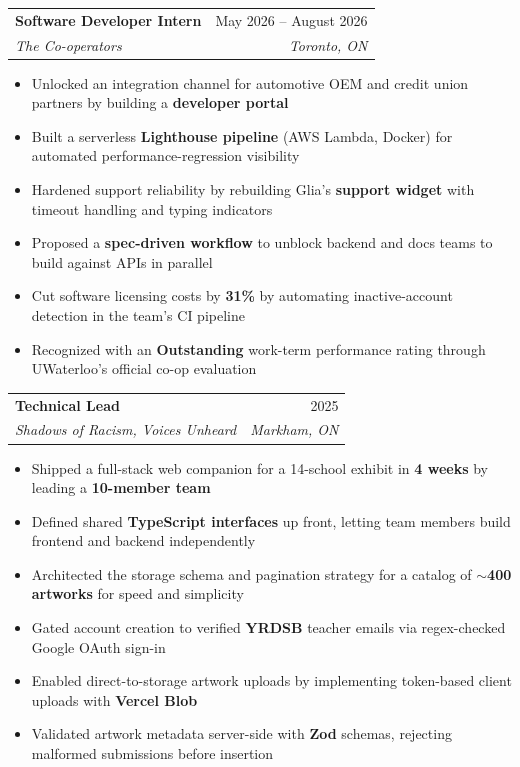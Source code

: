 \documentclass[letterpaper,11pt]{article}
\makeatletter
\newcommand{\resumeItem}[1]{
  \item\small{
    {#1 \vspace{-2pt}}
  }
}
\newcommand{\resumeSubheading}[4]{
  \vspace{-2pt}\item
    \begin{tabular*}{0.97\textwidth}[t]{l@{\extracolsep{\fill}}r}
      \textbf{#1} & #2 \\
      \textit{\small#3} & \textit{\small #4} \\
    \end{tabular*}\vspace{-7pt}
}
\newcommand{\resumeSubSubheading}[2]{
    \item
    \begin{tabular*}{0.97\textwidth}{l@{\extracolsep{\fill}}r}
      \textit{\small#1} & \textit{\small #2} \\
    \end{tabular*}\vspace{-7pt}
}
\newcommand{\resumeSubHeadingListEnd}{\end{itemize}}
\newcommand{\resumeItemListStart}{\begin{itemize}}
\newcommand{\resumeItemListEnd}{\end{itemize}\vspace{-5pt}}
\makeatother
\begin{document}

    \resumeSubheading
      {Software Developer Intern}{May 2026 -- August 2026}
      {The Co-operators}{Toronto, ON}
      \resumeItemListStart
        \resumeItem{Unlocked an integration channel for automotive OEM and credit union partners by building a \textbf{developer portal}}
        \resumeItem{Built a serverless \textbf{Lighthouse pipeline} (AWS Lambda, Docker) for automated performance-regression visibility}
        \resumeItem{Hardened support reliability by rebuilding Glia's \textbf{support widget} with timeout handling and typing indicators}
        \resumeItem{Proposed a \textbf{spec-driven workflow} to unblock backend and docs teams to build against APIs in parallel}
        \resumeItem{Cut software licensing costs by \textbf{31\%} by automating inactive-account detection in the team's CI pipeline}
        \resumeItem{Recognized with an \textbf{Outstanding} work-term performance rating through UWaterloo's official co-op evaluation}
      \resumeItemListEnd

    \resumeSubheading
      {Technical Lead}{2025}
      {Shadows of Racism, Voices Unheard}{Markham, ON}
      \resumeItemListStart
        \resumeItem{Shipped a full-stack web companion for a 14-school exhibit in \textbf{4 weeks} by leading a \textbf{10-member team}}
        \resumeItem{Defined shared \textbf{TypeScript interfaces} up front, letting team members build frontend and backend independently}
        \resumeItem{Architected the storage schema and pagination strategy for a catalog of \textbf{$\sim$400 artworks} for speed and simplicity}
        \resumeItem{Gated account creation to verified \textbf{YRDSB} teacher emails via regex-checked Google OAuth sign-in}
        \resumeItem{Enabled direct-to-storage artwork uploads by implementing token-based client uploads with \textbf{Vercel Blob}}
        \resumeItem{Validated artwork metadata server-side with \textbf{Zod} schemas, rejecting malformed submissions before insertion}
      \resumeItemListEnd
\end{document}
